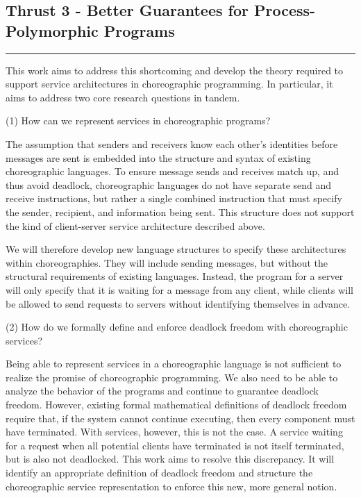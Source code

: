 \subsection{Thrust 3 - Better Guarantees for Process-Polymorphic Programs}
\label{sec:t3}

\iffalse
\vspace*{0.5em}
\hrule
\vspace*{0.5em}


This work aims to address this shortcoming and develop the theory required to support service architectures in choreographic programming.
In particular, it aims to address two core research questions in tandem.

(1) How can we represent services in choreographic programs?

The assumption that senders and receivers know each other's identities before messages are sent
is embedded into the structure and syntax of existing choreographic languages.
To ensure message sends and receives match up, and thus avoid deadlock,
choreographic languages do not have separate send and receive instructions,
but rather a single combined instruction that must specify the sender, recipient, and information being sent.
This structure does not support the kind of client-server service architecture described above.

We will therefore develop new language structures to specify these architectures within choreographies.
They will include sending messages, but without the structural requirements of existing languages.
Instead, the program for a server will only specify that it is waiting for a message from any client,
while clients will be allowed to send requests to servers without identifying themselves in advance.

(2) How do we formally define and enforce deadlock freedom with choreographic services?

Being able to represent services in a choreographic language is not sufficient to realize the promise of choreographic programming.
We also need to be able to analyze the behavior of the programs and continue to guarantee deadlock freedom.
However, existing formal mathematical definitions of deadlock freedom require that,
if the system cannot continue executing, then every component must have terminated.
With services, however, this is not the case.
A service waiting for a request when all potential clients have terminated is not itself terminated, but is also not deadlocked.
This work aims to resolve this discrepancy.
It will identify an appropriate definition of deadlock freedom and structure
the choreographic service representation to enforce this new, more general notion.

